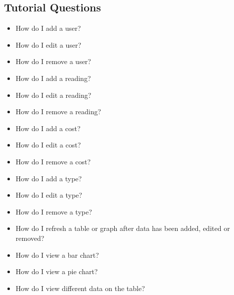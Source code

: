 \subsection{Tutorial Questions}
\begin{itemize}
	\item How do I add a user?
	\item How do I edit a user?
	\item How do I remove a user?
	\item How do I add a reading?
	\item How do I edit a reading?
	\item How do I remove a reading?
	\item How do I add a cost?
	\item How do I edit a cost?
	\item How do I remove a cost?
	\item How do I add a type?
	\item How do I edit a type?
	\item How do I remove a type?
	\item How do I refresh a table or graph after data has been added, edited or removed?
	\item How do I view a bar chart?
	\item How do I view a pie chart?
	\item How do I view different data on the table?
\end{itemize}

